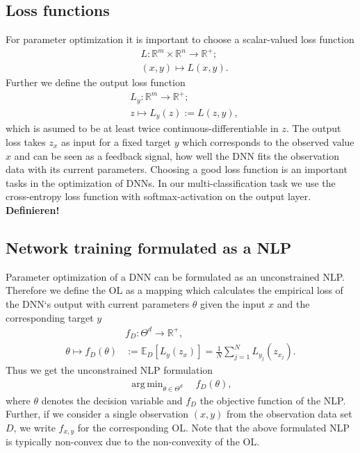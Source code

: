 \documentclass[conference]{IEEEtran}
\DeclareMathOperator*{\argmin}{arg\,min}
\begin{document}
	\subsection{Loss functions}
	\noindent
	For parameter optimization it is important to choose a scalar-valued loss function
	\begin{align}
	&L:\mathbb{R}^{m}\times \mathbb{R}^{n}\rightarrow \mathbb{R}^{+};\\
	&(x, y)\mapsto L(x, y).
	\end{align}
	Further we define the output loss function
	\begin{align}
	&L_{y}:\mathbb{R}^{m}\rightarrow \mathbb{R}^{+};\\
	&z\mapsto L_{y}(z) := L(z, y),
	\end{align}
	which is asumed to be at least twice continuous-differentiable in $z$. The output loss takes $z_{x}$ as input for a fixed target $y$ which corresponds to the observed value $x$ and can be seen as a feedback signal, how well the DNN fits the observation data with its current parameters. Choosing a good loss function is an important tasks in the optimization of DNNs. In our multi-classification task we use the cross-entropy loss function with softmax-activation on the output layer. 
	\textbf{Definieren!}
	
	\subsection{Network training formulated as a NLP}
	Parameter optimization of a DNN can be formulated as an unconstrained NLP. Therefore we define the OL as a mapping which calculates the empirical loss of the DNN`s output with current parameters $\theta$ given the input $x$ and the corresponding target $y$
	\begin{align}
	&f_{D}:\Theta^{d}\rightarrow\mathbb{R}^{+},\\
	\theta\mapsto f_{D}(\theta) &:= \mathbb{E}_{D}[L_{y}(z_{x})] =  \frac{1}{N}\sum_{j = 1}^{N}L_{y_{j}}(z_{x_{j}}).
	\end{align}
	Thus we get the unconstrained NLP formulation
	\begin{align}
	\argmin_{\theta\in\Theta^{d}}\quad f_{D}(\theta),
	\end{align}
	where $\theta$ denotes the decision variable and $f_{D}$ the objective function of the NLP.
	Further, if we consider a single observation $(x, y)$ from the observation data set $D$, we write  $f_{x, y}$ for the corresponding OL. Note that the above formulated NLP is typically non-convex due to the non-convexity of the OL.
	
\end{document}
